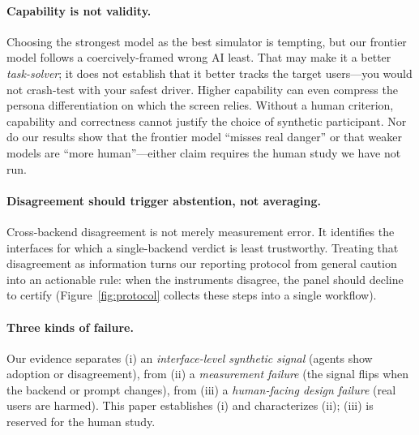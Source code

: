 \documentclass[manuscript,review,anonymous]{acmart}
\begin{document}
\paragraph{Capability is not validity.} Choosing the strongest model as the best simulator is tempting,
but our frontier model follows a coercively-framed wrong AI least. That may make it a better
\emph{task-solver}; it does not establish that it better tracks the target users---you would not
crash-test with your safest driver. Higher capability can even compress the persona differentiation on
which the screen relies. Without a human criterion, capability and correctness cannot justify the choice of
synthetic participant. Nor do our results show that the frontier model ``misses real danger'' or that
weaker models are ``more human''---either claim requires the human study we have not run.

\paragraph{Disagreement should trigger abstention, not averaging.} Cross-backend disagreement is not merely
measurement error. It identifies the interfaces for which a single-backend verdict is least trustworthy.
Treating that disagreement as information turns our reporting protocol from
general caution into an actionable rule: when the instruments disagree, the panel should decline to certify
(Figure~\ref{fig:protocol} collects these steps into a single workflow).

\paragraph{Three kinds of failure.} Our evidence separates (i) an \emph{interface-level synthetic signal}
(agents show adoption or disagreement), from (ii) a \emph{measurement failure} (the signal flips when the
backend or prompt changes), from (iii) a \emph{human-facing design failure} (real users are harmed). This
paper establishes (i) and characterizes (ii); (iii) is reserved for the human study.
\end{document}

